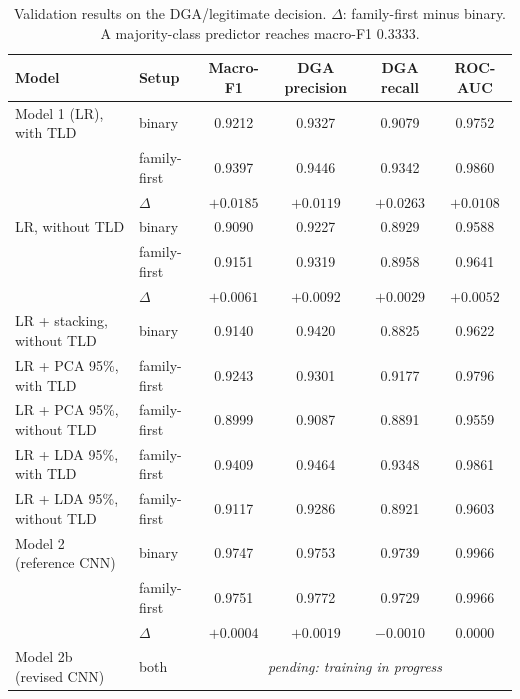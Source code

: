 \documentclass[11pt]{article}
\begin{document}
\begin{table}[h]
\centering
\small
\caption{Validation results on the DGA/legitimate decision. $\Delta$:
family-first minus binary. A majority-class predictor reaches macro-F1 0.3333.}
\label{tab:results}
\begin{tabular}{@{}llcccc@{}}
\toprule
Model & Setup & Macro-F1 & DGA precision & DGA recall & ROC-AUC \\
\midrule
Model 1 (LR), with TLD & binary & 0.9212 & 0.9327 & 0.9079 & 0.9752 \\
 & family-first & 0.9397 & 0.9446 & 0.9342 & 0.9860 \\
 & $\Delta$ & $+0.0185$ & $+0.0119$ & $+0.0263$ & $+0.0108$ \\
LR, without TLD & binary & 0.9090 & 0.9227 & 0.8929 & 0.9588 \\
 & family-first & 0.9151 & 0.9319 & 0.8958 & 0.9641 \\
 & $\Delta$ & $+0.0061$ & $+0.0092$ & $+0.0029$ & $+0.0052$ \\
\midrule
LR + stacking, without TLD & binary & 0.9140 & 0.9420 & 0.8825 & 0.9622 \\
LR + PCA 95\%, with TLD & family-first & 0.9243 & 0.9301 & 0.9177 & 0.9796 \\
LR + PCA 95\%, without TLD & family-first & 0.8999 & 0.9087 & 0.8891 & 0.9559 \\
LR + LDA 95\%, with TLD & family-first & 0.9409 & 0.9464 & 0.9348 & 0.9861 \\
LR + LDA 95\%, without TLD & family-first & 0.9117 & 0.9286 & 0.8921 & 0.9603 \\
\midrule
Model 2 (reference CNN) & binary & 0.9747 & 0.9753 & 0.9739 & 0.9966 \\
 & family-first & 0.9751 & 0.9772 & 0.9729 & 0.9966 \\
 & $\Delta$ & $+0.0004$ & $+0.0019$ & $-0.0010$ & $0.0000$ \\
\midrule
Model 2b (revised CNN) & both & \multicolumn{4}{c}{\emph{pending: training in progress}} \\
\bottomrule
\end{tabular}
\end{table}
\end{document}
